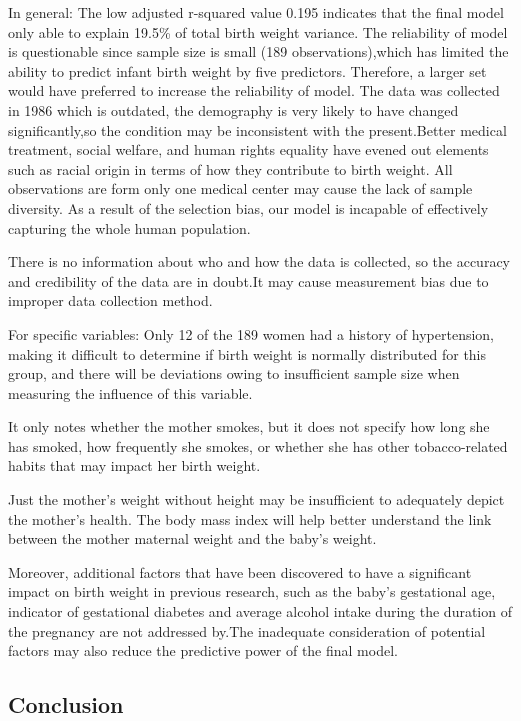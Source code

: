\documentclass[9pt,twocolumn,twoside,]{pnas-new}
\begin{document}
In general: The low adjusted r-squared value 0.195 indicates that the
final model only able to explain 19.5\% of total birth weight variance.
The reliability of model is questionable since sample size is small (189
observations),which has limited the ability to predict infant birth
weight by five predictors. Therefore, a larger set would have preferred
to increase the reliability of model. The data was collected in 1986
which is outdated, the demography is very likely to have changed
significantly,so the condition may be inconsistent with the
present.Better medical treatment, social welfare, and human rights
equality have evened out elements such as racial origin in terms of how
they contribute to birth weight. All observations are form only one
medical center may cause the lack of sample diversity. As a result of
the selection bias, our model is incapable of effectively capturing the
whole human population.

There is no information about who and how the data is collected, so the
accuracy and credibility of the data are in doubt.It may cause
measurement bias due to improper data collection method.

For specific variables: Only 12 of the 189 women had a history of
hypertension, making it difficult to determine if birth weight is
normally distributed for this group, and there will be deviations owing
to insufficient sample size when measuring the influence of this
variable.

It only notes whether the mother smokes, but it does not specify how
long she has smoked, how frequently she smokes, or whether she has other
tobacco-related habits that may impact her birth weight.

Just the mother's weight without height may be insufficient to
adequately depict the mother's health. The body mass index will help
better understand the link between the mother maternal weight and the
baby's weight.

Moreover, additional factors that have been discovered to have a
significant impact on birth weight in previous research, such as the
baby's gestational age, indicator of gestational diabetes and average
alcohol intake during the duration of the pregnancy are not addressed
by.The inadequate consideration of potential factors may also reduce the
predictive power of the final model.

\hypertarget{conclusion}{%
\subsection*{Conclusion}\label{conclusion}}
\end{document}
